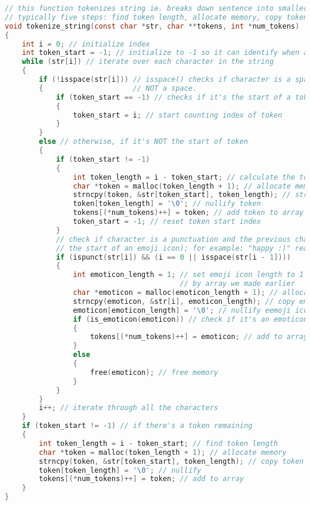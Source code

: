 \documentclass{report}
\begin{document}
\begin{lstlisting}[language=C]
// this function tokenizes string ie. breaks down sentence into smaller parts to read words, punctuation & spaces
// typically five steps: find token length, allocate memory, copy token from string, nullify token, add to array
void tokenize_string(const char *str, char **tokens, int *num_tokens) 
{ 
    int i = 0; // initialize index
    int token_start = -1; // initialize to -1 so it can identify when a new token begins (see below)
    while (str[i]) // iterate over each character in the string
    { 
        if (!isspace(str[i])) // isspace() checks if character is a space; we're checking to see if it's 
        {                     // NOT a space. 
            if (token_start == -1) // checks if it's the start of a token                            
            { 
                token_start = i; // start counting index of token
            }
        } 
        else // otherwise, if it's NOT the start of token
        { 
            if (token_start != -1)
            { 
                int token_length = i - token_start; // calculate the token length
                char *token = malloc(token_length + 1); // allocate memory for token
                strncpy(token, &str[token_start], token_length); // strncpy() to copy token from the string
                token[token_length] = '\0'; // nullify token
                tokens[(*num_tokens)++] = token; // add token to array
                token_start = -1; // reset token start index
            }
            // check if character is a punctuation and the previous character is a space (indicating it's
            // the start of an emoji icon); for example: "happy :)" reads space before ":)" 
            if (ispunct(str[i]) && (i == 0 || isspace(str[i - 1]))) 
            {
                int emoticon_length = 1; // set emoji icon length to 1 since they'e considered single characters
                                         // by array we made earlier
                char *emoticon = malloc(emoticon_length + 1); // allocate memory for the emoji icon
                strncpy(emoticon, &str[i], emoticon_length); // copy emoji icon from the string
                emoticon[emoticon_length] = '\0'; // nullify eemoji icon
                if (is_emoticon(emoticon)) // check if it's an emoticon
                { 
                    tokens[(*num_tokens)++] = emoticon; // add to array
                } 
                else 
                {
                    free(emoticon); // free memory
                }
            }
        }
        i++; // iterate through all the characters
    }
    if (token_start != -1) // if there's a token remaining
    { 
        int token_length = i - token_start; // find token length
        char *token = malloc(token_length + 1); // allocate memory
        strncpy(token, &str[token_start], token_length); // copy token from string
        token[token_length] = '\0'; // nullify
        tokens[(*num_tokens)++] = token; // add to array
    }
}


\end{lstlisting}
\end{document}
